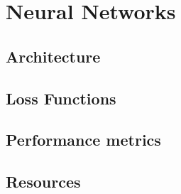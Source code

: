 \chapter{Neural Networks}
\label{append:neural-networks}

\section{Architecture}

\lipsum[51]

\section{Loss Functions}

\lipsum[52]

\section{Performance metrics}

\lipsum[53]

\section{Resources}

\lipsum[54]
